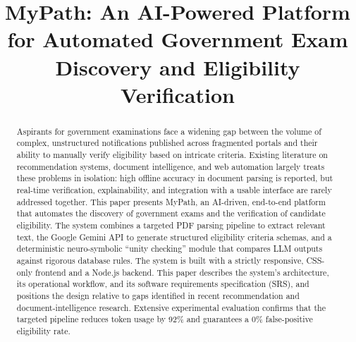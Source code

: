 \documentclass[conference]{IEEEtran}
\begin{document}
\title{MyPath: An AI-Powered Platform for Automated Government Exam Discovery and Eligibility Verification}

\author{
\and
{}
}

\maketitle

\begin{abstract}
Aspirants for government examinations face a widening gap between the volume of complex, unstructured notifications published across fragmented portals and their ability to manually verify eligibility based on intricate criteria. Existing literature on recommendation systems, document intelligence, and web automation largely treats these problems in isolation: high offline accuracy in document parsing is reported, but real-time verification, explainability, and integration with a usable interface are rarely addressed together. This paper presents MyPath, an AI-driven, end-to-end platform that automates the discovery of government exams and the verification of candidate eligibility. The system combines a targeted PDF parsing pipeline to extract relevant text, the Google Gemini API to generate structured eligibility criteria schemas, and a deterministic neuro-symbolic ``unity checking'' module that compares LLM outputs against rigorous database rules. The system is built with a strictly responsive, CSS-only frontend and a Node.js backend. This paper describes the system's architecture, its operational workflow, and its software requirements specification (SRS), and positions the design relative to gaps identified in recent recommendation and document-intelligence research. Extensive experimental evaluation confirms that the targeted pipeline reduces token usage by 92\% and guarantees a 0\% false-positive eligibility rate.
\end{abstract}
\end{document}
